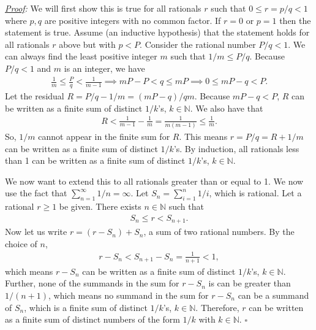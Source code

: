 \documentclass[11pt]{article}
\newcommand{\f}[2]{\frac{#1}{#2}}
\begin{document}
\begin{enumerate}[(a)]
	\noindent \textit{\underline{Proof}:} We will first show this is true for all rationals $r$ such that $0 \leq r=p/q < 1$ where $p,q$ are positive integers with no common factor. If $r=0$ or $p=1$ then the statement is true. Assume (an inductive hypothesis) that the statement holds for all rationals $r$ above but with $p<P$. Consider the rational number $P/q < 1$. We can always find the least positive integer $m$ such that $1/m \leq P/q$. Because $P/q < 1$ and $m$ is an integer, we have 
	\begin{align*}
	\f{1}{m} \leq \f{P}{q} < \f{1}{m-1} \implies mP - P < q \leq mP \implies 0 \leq mP-q < P.
	\end{align*}  
	Let the residual $R = P/q - 1/m = (mP-q)/qm$. Because $mP -q < P$, $R$ can be written as a finite sum of distinct $1/k$'s, $k\in \mathbb{N}$. We also have that 
	\begin{align*}
	R < \f{1}{m-1} - \f{1}{m} = \f{1}{m(m-1)} \leq \f{1}{m}.
	\end{align*} 
	So, $1/m$ cannot appear in the finite sum for $R$. This means $r = P/q = R + 1/m$ can be written as a finite sum of distinct $1/k$'s. By induction, all rationals less than 1 can be written as a finite sum of distinct $1/k$'s, $k\in \mathbb{N}$. 
	
	We now want to extend this to all rationals greater than or equal to 1. We now use the fact that $\sum^\infty_{n=1}1/n = \infty$. Let $S_n = \sum^n_{i=1}1/i$, which is rational. Let a rational $r \geq 1$ be given. There exists $n\in \mathbb{N}$ such that 
	\begin{align*}
	S_{n} \leq r < S_{n+1}.
	\end{align*}
	Now let us write $r = (r - S_n) + S_n$, a sum of two rational numbers. By the choice of $n$,
	\begin{align*}
	r - S_n < S_{n+1} - S_n = \f{1}{n+1} < 1,
	\end{align*} 
	which means $r - S_n$ can be written as a finite sum of distinct $1/k$'s, $k\in \mathbb{N}$. Further, none of the summands in the sum for $r - S_n$ is can be greater than $1/(n+1)$, which means no summand in the sum for $r-S_n$ can be a summand of $S_n$, which is a finite sum of distinct $1/k$'s, $k\in \mathbb{N}$. Therefore, $r$ can be written as a finite sum of distinct numbers of the form $1/k$ with $k \in \mathbb{N}$. \hfill $\square$
	
 	
	 
\end{enumerate}
\end{document}
